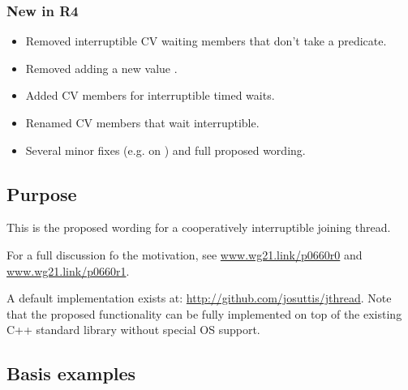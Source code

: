\subsubsection*{New in R4}
\begin{itemize}
 \item Removed interruptible CV waiting members that don't take a predicate.
 \item Removed adding a new  value .
 \item Added CV members for interruptible timed waits.
 \item Renamed CV members that wait interruptible.
 \item Several minor fixes (e.g. on ) and full proposed wording.
\end{itemize}

\subsection*{Purpose}

This is the proposed wording for a cooperatively interruptible joining thread.

For a full discussion fo the motivation, see
\url{www.wg21.link/p0660r0} and
\url{www.wg21.link/p0660r1}.

A default implementation exists at:
\url{http://github.com/josuttis/jthread}.
Note that the proposed functionality can be fully implemented 
on top of the existing C++ standard library without special OS support.

\subsection*{Basis examples}

